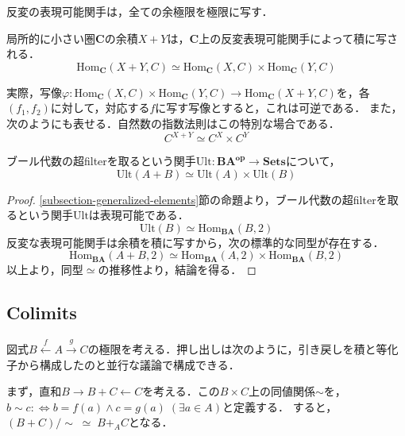 \documentclass[uplatex, 12pt, dvipdfmx]{jsarticle}
\begin{document}
\begin{corollary}
    反変の表現可能関手は，全ての余極限を極限に写す．
\end{corollary}
\begin{example*}
    局所的に小さい圏$\mathbf{C}$の余積$X+Y$は，$\mathbf{C}$上の反変表現可能関手によって積に写される．
    \[ \mathrm{Hom}_\mathbf{C}(X+Y,C)\simeq \mathrm{Hom}_\mathbf{C}(X,C)\times \mathrm{Hom}_\mathbf{C}(Y,C) \]
    \begin{center}
    \end{center}
    実際，写像$\varphi:\mathrm{Hom}_\mathbf{C}(X,C)\times \mathrm{Hom}_\mathbf{C}(Y,C)\to\mathrm{Hom}_\mathbf{C}(X+Y,C)$を，各$(f_1,f_2)$に対して，対応する$f$に写す写像とすると，これは可逆である．
    また，次のようにも表せる．自然数の指数法則はこの特別な場合である．
    \[ C^{X+Y}\simeq C^X\times C^Y \]
\end{example*}

\vspace{3cm}

\begin{proposition*}
    ブール代数の超filterを取るという関手$\mathrm{Ult}:\mathbf{BA^{op}}\to\mathbf{Sets}$について，
    \[ \mathrm{Ult}(A+B)\simeq\mathrm{Ult}(A)\times\mathrm{Ult}(B) \]
\end{proposition*}
\begin{proof}
    \ref{subsection-generalized-elements}節の命題より，ブール代数の超filterを取るという関手$\mathrm{Ult}$は表現可能である．
    \[ \mathrm{Ult}(B)\simeq\mathrm{Hom}_\mathbf{BA}(B,2) \]
    反変な表現可能関手は余積を積に写すから，次の標準的な同型が存在する．
    \[ \mathrm{Hom}_\mathbf{BA}(A+B,2) \simeq \mathrm{Hom}_\mathbf{BA}(A,2)\times\mathrm{Hom}_\mathbf{BA}(B,2) \]
    以上より，同型$\simeq$の推移性より，結論を得る．
\end{proof}

\vspace{3cm}

\subsection{Colimits}

\begin{example*}[Setsでの押し出し]
    図式$B\xleftarrow{f}A\xrightarrow{g}C$の極限を考える．押し出しは次のように，引き戻しを積と等化子から構成したのと並行な議論で構成できる．

    まず，直和$B\rightarrow B+C \leftarrow C$を考える．この$B\times C$上の同値関係$\sim$を，$b\sim c:\Leftrightarrow b=f(a)\land c=g(a)\;(\exists a\in A)$と定義する．
    すると，$(B+C)/\sim\;\simeq\; B+_AC$となる．
\end{example*}
\end{document}

